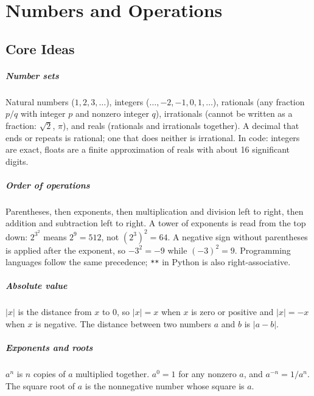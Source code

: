 \chapter{Numbers and Operations}


\section{Core Ideas}

\paragraph{Number sets} Natural numbers ($1, 2, 3, \ldots$), integers ($\ldots, -2, -1, 0, 1, \ldots$), rationals (any fraction $p/q$ with integer $p$ and nonzero integer $q$), irrationals (cannot be written as a fraction: $\sqrt{2}$, $\pi$), and reals (rationals and irrationals together). A decimal that ends or repeats is rational; one that does neither is irrational. In code: integers are exact, floats are a finite approximation of reals with about 16 significant digits.

\paragraph{Order of operations} Parentheses, then exponents, then multiplication and division left to right, then addition and subtraction left to right. A tower of exponents is read from the top down: $2^{3^2}$ means $2^9 = 512$, not $(2^3)^2 = 64$. A negative sign without parentheses is applied after the exponent, so $-3^2 = -9$ while $(-3)^2 = 9$. Programming languages follow the same precedence; \lstinline!**! in Python is also right-associative.

\paragraph{Absolute value} $|x|$ is the distance from $x$ to $0$, so $|x| = x$ when $x$ is zero or positive and $|x| = -x$ when $x$ is negative. The distance between two numbers $a$ and $b$ is $|a - b|$.

\paragraph{Exponents and roots} $a^n$ is $n$ copies of $a$ multiplied together. $a^0 = 1$ for any nonzero $a$, and $a^{-n} = 1/a^n$. The square root of $a$ is the nonnegative number whose square is $a$.

